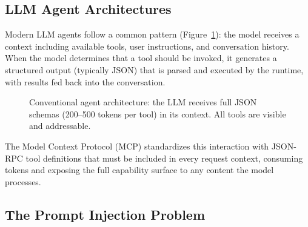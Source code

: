 \documentclass{article}
\begin{document}
\subsection{LLM Agent Architectures}

Modern LLM agents follow a common pattern (Figure~\ref{fig:conventional}): the model receives a context including available tools, user instructions, and conversation history. When the model determines that a tool should be invoked, it generates a structured output (typically JSON) that is parsed and executed by the runtime, with results fed back into the conversation.

\begin{figure}[h]
\centering
{}
\caption{Conventional agent architecture: the LLM receives full JSON schemas (200--500 tokens per tool) in its context. All tools are visible and addressable.}
\label{fig:conventional}
\end{figure}

The Model Context Protocol (MCP) standardizes this interaction with JSON-RPC tool definitions that must be included in every request context, consuming tokens and exposing the full capability surface to any content the model processes.

\subsection{The Prompt Injection Problem}
\end{document}
